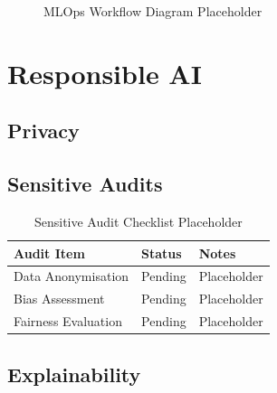 \documentclass[12pt, a4paper]{report}
\begin{document}
\begin{figure}[H]
    \centering
    \fbox{\rule{0pt}{5cm}\rule{0.75\textwidth}{0pt}}
    \caption{MLOps Workflow Diagram Placeholder}
    \label{fig:mlops}
\end{figure}

\lipsum[38][1-2]

\chapter{Responsible AI}

\lipsum[39][1-3]

\section{Privacy}

\lipsum[40][1-4]

\section{Sensitive Audits}

\lipsum[41][1-4]

\begin{table}[H]
    \centering
    \caption{Sensitive Audit Checklist Placeholder}
    \begin{tabular}{lll}
        \toprule
        \textbf{Audit Item}  & \textbf{Status}   & \textbf{Notes}      \\
        \midrule
        Data Anonymisation   & Pending           & Placeholder         \\
        Bias Assessment      & Pending           & Placeholder         \\
        Fairness Evaluation  & Pending           & Placeholder         \\
        \bottomrule
    \end{tabular}
    \label{tab:sensitive-audit}
\end{table}

\section{Explainability}
\end{document}
